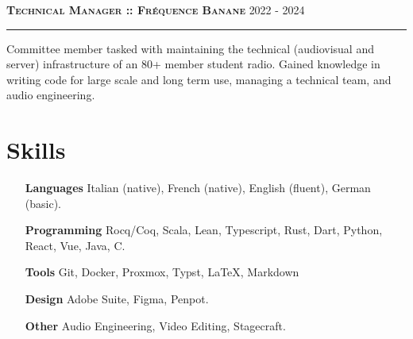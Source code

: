 \documentclass[11pt]{article}
\renewcommand{\line}[2]{{\vspace{12pt} \large \noindent\textbf{\textsc{#1}} \hfill \small{#2}}{\vspace{2pt}\hrule\vspace{4pt}}}
\begin{document}
  \line{Technical Manager :: Fréquence Banane}{2022 - 2024}

  Committee member tasked with maintaining the technical (audiovisual and server) infrastructure of an 80+ member student radio. Gained knowledge in writing code for large scale and long term use, managing a technical team, and audio engineering.

  \section*{Skills}

  \vspace{-0.5em}
  \begin{adjustwidth}{6em}{}
    \begin{itemize}
      \item[\textbf{Languages}] Italian (native), French (native), English (fluent), German (basic).
      \item[\textbf{Programming}] Rocq/Coq, Scala, Lean, Typescript, Rust, Dart, Python, React, Vue, Java, C.
      \item[\textbf{Tools}] Git, Docker, Proxmox, Typst, LaTeX, Markdown
      \item[\textbf{Design}] Adobe Suite, Figma, Penpot.
      \item[\textbf{Other}] Audio Engineering, Video Editing, Stagecraft.
    \end{itemize}
  \end{adjustwidth}
\end{document}
